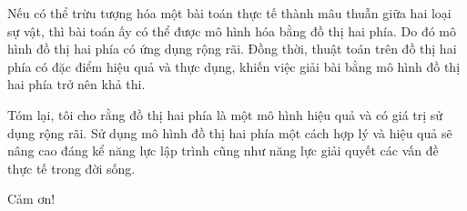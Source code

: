 \documentclass[11pt]{article}
\begin{document}
Nếu có thể trừu tượng hóa một bài toán thực tế thành mâu thuẫn giữa hai loại
sự vật, thì bài toán ấy có thể được mô hình hóa bằng đồ thị hai phía. Do đó
mô hình đồ thị hai phía có ứng dụng rộng rãi. Đồng thời, thuật toán trên đồ
thị hai phía có đặc điểm hiệu quả và thực dụng, khiến việc giải bài bằng mô
hình đồ thị hai phía trở nên khả thi.

Tóm lại, tôi cho rằng đồ thị hai phía là một mô hình hiệu quả và có giá trị
sử dụng rộng rãi. Sử dụng mô hình đồ thị hai phía một cách hợp lý và hiệu quả
sẽ nâng cao đáng kể năng lực lập trình cũng như năng lực giải quyết các vấn
đề thực tế trong đời sống.

\begin{center}
Cảm ơn!
\end{center}
\end{document}
